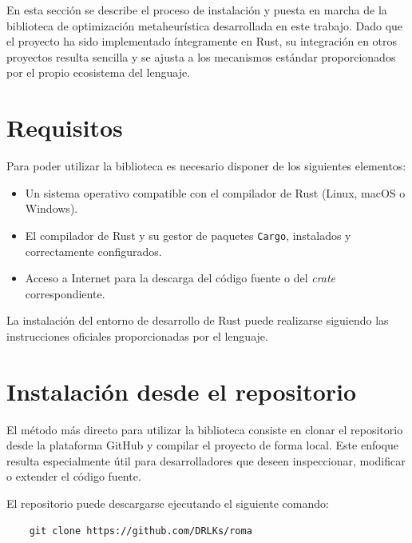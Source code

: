 \documentclass[12pt,a4paper,twoside,openright]{book}
\begin{document}
\begin{umaappendices}
    

\small %

    En esta sección se describe el proceso de instalación y puesta en marcha de la biblioteca de optimización metaheurística desarrollada en este trabajo. Dado que el proyecto ha sido implementado íntegramente en Rust, su integración en otros proyectos resulta sencilla y se ajusta a los mecanismos estándar proporcionados por el propio ecosistema del lenguaje.

\section{Requisitos}

    Para poder utilizar la biblioteca es necesario disponer de los siguientes elementos:
    
    \begin{itemize}
        \item Un sistema operativo compatible con el compilador de Rust (Linux, macOS o Windows).
        \item El compilador de Rust y su gestor de paquetes \texttt{Cargo}, instalados y correctamente configurados.
        \item Acceso a Internet para la descarga del código fuente o del \emph{crate} correspondiente.
    \end{itemize}

    La instalación del entorno de desarrollo de Rust puede realizarse siguiendo las instrucciones oficiales proporcionadas por el lenguaje.

\section{Instalación desde el repositorio}

    El método más directo para utilizar la biblioteca consiste en clonar el repositorio desde la plataforma GitHub y compilar el proyecto de forma local. Este enfoque resulta especialmente útil para desarrolladores que deseen inspeccionar, modificar o extender el código fuente.

    El repositorio puede descargarse ejecutando el siguiente comando:

    \begin{verbatim}
    git clone https://github.com/DRLKs/roma
    \end{verbatim}


\end{umaappendices}
\end{document}
